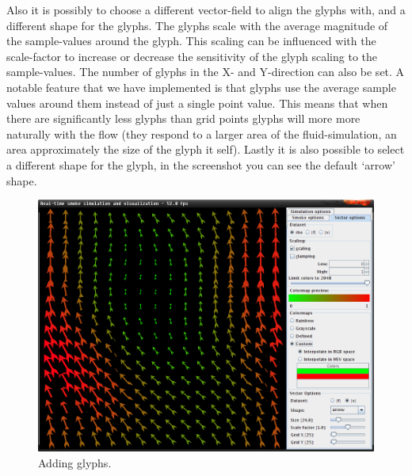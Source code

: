 \documentclass[a4paper,11pt,twoside]{report}
\begin{document}
		Also it is possibly to choose a different vector-field to align the glyphs with, and a different shape for the glyphs. The glyphs scale with the average magnitude of the sample-values around the glyph. This scaling can be influenced with the scale-factor to increase or decrease the sensitivity of the glyph scaling to the sample-values. The number of glyphs in the X- and Y-direction can also be set. A notable feature that we have implemented is that glyphs use the average sample values around them instead of just a single point value. This means that when there are significantly less glyphs than grid points glyphs will more more naturally with the flow (they respond to a larger area of the fluid-simulation, an area approximately the size of the glyph it self).
		Lastly it is also possible to select a different shape for the glyph, in the screenshot you can see the default `arrow' shape.
		\begin{figure}[h]
		\centering
		\includegraphics[scale=\imagescalefactor]{images/step3.png}
		\caption{Adding glyphs.}\label{fig:step3}
		\end{figure}
		\clearpage
\end{document}
